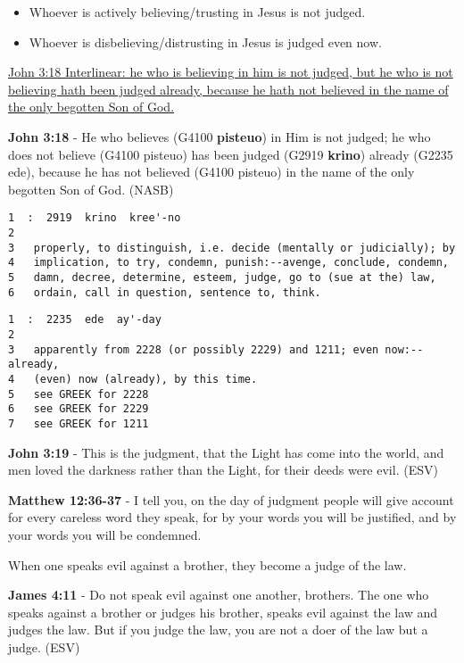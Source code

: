 \documentclass[11pt]{article}
\begin{document}
\begin{itemize}
\item Whoever is actively believing/trusting in Jesus is not judged.
\item Whoever is disbelieving/distrusting in Jesus is judged even now.
\end{itemize}

\href{https://biblehub.com/interlinear/john/3-18.htm}{John 3:18 Interlinear: he who is believing in him is not judged, but he who is not believing hath been judged already, because he hath not believed in the name of the only begotten Son of God.}

\textbf{John 3:18} - He who believes (G4100 \textbf{pisteuo}) in Him is not judged; he who does not believe (G4100 pisteuo) has been judged (G2919 \textbf{krino}) already (G2235 ede), because he has not believed (G4100 pisteuo) in the name of the only begotten Son of God. (NASB)

\begin{verbatim}
1  :  2919  krino  kree'-no
2  
3   properly, to distinguish, i.e. decide (mentally or judicially); by
4   implication, to try, condemn, punish:--avenge, conclude, condemn,
5   damn, decree, determine, esteem, judge, go to (sue at the) law,
6   ordain, call in question, sentence to, think.
\end{verbatim}

\begin{verbatim}
1  :  2235  ede  ay'-day
2  
3   apparently from 2228 (or possibly 2229) and 1211; even now:--already,
4   (even) now (already), by this time.
5   see GREEK for 2228
6   see GREEK for 2229
7   see GREEK for 1211
\end{verbatim}

\textbf{John 3:19} - This is the judgment, that the Light has come into the world, and men loved the darkness rather than the Light, for their deeds were evil. (ESV)

\textbf{Matthew 12:36-37} - I tell you, on the day of judgment people will give account for every careless word they speak, for by your words you will be justified, and by your words you will be condemned.

When one speaks evil against a brother, they become a judge of the law.

\textbf{James 4:11} - Do not speak evil against one another, brothers. The one who speaks against a brother or judges his brother, speaks evil against the law and judges the law. But if you judge the law, you are not a doer of the law but a judge. (ESV)
\end{document}
